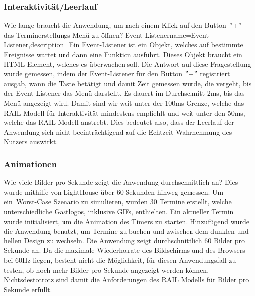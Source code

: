 \subsubsection{Interaktivität/Leerlauf}\label{subsubsec:test-1}
\newline
\newline
Wie lange braucht die Anwendung, um nach einem Klick auf den Button \("\)+\("\) das Terminerstellungs-Menü zu öffnen?
\gls{Event-Listener}{name={Event-Listener},description={Ein Event-Listener ist ein Objekt, welches auf bestimmte Ereignisse wartet und dann eine Funktion ausführt. Dieses Objekt braucht ein HTML Element, welches es überwachen soll.}}
Die Antwort auf diese Fragestellung wurde gemessen, indem der Event-Listener für den Button \("\)+\("\) registriert ausgab, wann die Taste betätigt und damit Zeit gemessen wurde, die vergeht, bis der \gls{Event-Listener} das Menü darstellt.
Es dauert im Durchschnitt 2ms, bis das Menü angezeigt wird.
Damit sind wir weit unter der 100ms Grenze, welche das RAIL Modell für Interaktivität mindestens empfiehlt und weit unter den 50ms, welche das RAIL Modell anstrebt.
Dies bedeutet also, dass der Leerlauf der Anwendung sich nicht beeinträchtigend auf die Echtzeit-Wahrnehmung des Nutzers auswirkt.
\newline
\newline
\subsubsection{Animationen}\label{subsubsec:test-2}
\newline
\newline
Wie viele Bilder pro Sekunde zeigt die Anwendung durchschnittlich an?
Dies wurde mithilfe von LightHouse über 60 Sekunden hinweg gemessen.
\newline
Um ein~\gls{Worst-Case} Szenario zu simulieren, wurden 30 Termine erstellt, welche unterschiedliche Gastlogos, inklusive GIFs, enthielten.
Ein aktueller Termin wurde initialisiert, um die Animation des Timers zu starten.
Hinzufügend wurde die Anwendung benutzt, um Termine zu buchen und zwischen dem dunklen und hellen Design zu wechseln.
Die Anwendung zeigt durchschnittlich 60 Bilder pro Sekunde an.
Da die maximale Wiederholrate des Bildschirms und des Browsers bei 60Hz liegen, besteht nicht die Möglichkeit, für diesen Anwendungsfall zu testen, ob noch mehr Bilder pro Sekunde angezeigt werden können.
Nichtsdestotrotz sind damit die Anforderungen des RAIL Modells für Bilder pro Sekunde erfüllt.
\newline
\newline
